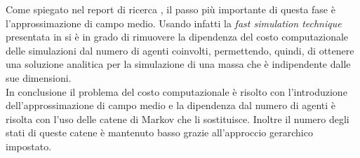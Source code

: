 Come spiegato nel report di ricerca \cite{hierarchical-report}, il passo più importante di questa fase è l'approssimazione di campo medio. Usando infatti la \textit{fast simulation technique} presentata in \cite{mean-field} si è in grado di rimuovere la dipendenza del costo computazionale delle simulazioni dal numero di agenti coinvolti, permettendo, quindi, di ottenere una soluzione analitica per la simulazione di una massa che è indipendente dalle sue dimensioni.\\
In conclusione il problema del costo computazionale è risolto con l'introduzione dell'approssimazione di campo medio e la dipendenza dal numero di agenti è risolta con l'uso delle catene di Markov che li sostituisce. Inoltre il numero degli stati di queste catene è mantenuto basso grazie all'approccio gerarchico impostato.

